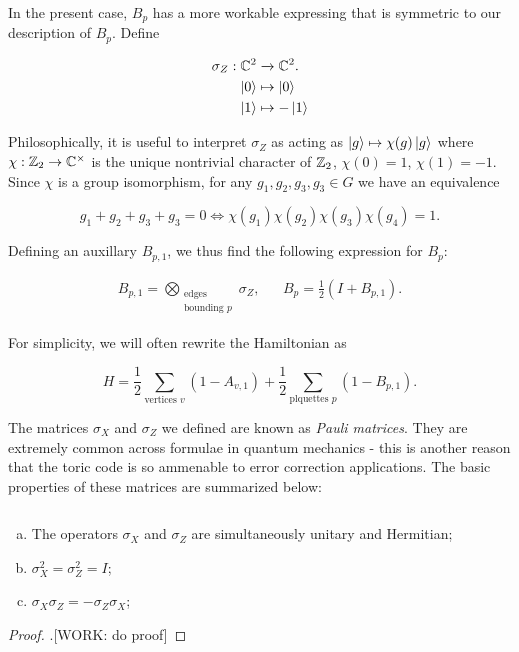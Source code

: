 In the present case, $B_p$ has a more workable expressing that is symmetric to our description of $B_p$. Define

\begin{align*}
\sigma_Z:\mathbb{C}^2&\xrightarrow{}\mathbb{C}^2.\\
\ket{0}&\mapsto \ket{0}\\
\ket{1}&\mapsto -\ket{1}
\end{align*}

Philosophically, it is useful to interpret $\sigma_Z$ as acting as $\ket{g}\mapsto \chi(g)\ket{g}$ where $\chi:\mathbb{Z}_2\to\mathbb{C}^\times$ is the unique nontrivial character of $\mathbb{Z}_2$, $\chi(0)=1$, $\chi(1)=-1$. Since $\chi$ is a group isomorphism, for any $g_1,g_2,g_3,g_3\in G$ we have an equivalence

$$g_1+g_2+g_3+g_3=0 \iff \chi(g_1)\chi(g_2)\chi(g_3)\chi(g_4)=1.$$

Defining an auxillary $B_{p,1}$, we thus find the following expression for $B_p$:

\begin{align*}
B_{p,1}=\bigotimes_{\substack{\text{edges} \\ \text{bounding }p}}\sigma_Z, && B_p=\frac{1}{2}\left(I + B_{p,1}\right).
\end{align*}

For simplicity, we will often rewrite the Hamiltonian as

$$H=\frac{1}{2}\sum_{\text{vertices }v}(1-A_{v,1})+\frac{1}{2}\sum_{\text{plquettes }p}(1-B_{p,1}).$$

The matrices $\sigma_X$ and $\sigma_Z$ we defined are known as \textit{Pauli matrices}. They are extremely common across formulae in quantum mechanics - this is another reason that the toric code is so ammenable to error correction applications. The basic properties of these matrices are summarized below:

\begin{proposition}$\,$
\begin{enumerate}[(a)]
\item The operators $\sigma_X$ and $\sigma_Z$ are simultaneously unitary and Hermitian;
\item $\sigma_X^2=\sigma_Z^2=I$;
\item $\sigma_X \sigma_Z = - \sigma_Z \sigma_X$;
\end{enumerate}
\end{proposition}
\begin{proof}.[WORK: do proof]
\end{proof}

